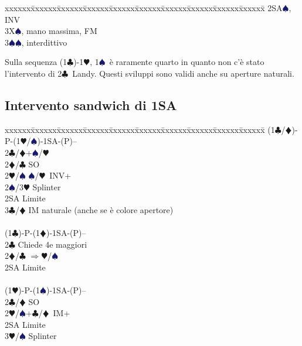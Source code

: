 \documentclass[a4paper,italian]{article}
\newcommand{\BC}{\textcolor{OliveGreen}{$\clubsuit$}}
\newcommand{\BD}{\textcolor{RedOrange}{$\vardiamondsuit$}}
\newcommand{\BH}{\textcolor{Red2}{$\varheartsuit${}}}
\newcommand{\BS}{\textcolor{MidnightBlue}{$\spadesuit${}}}
\newenvironment{bidtable}
{\begin{tabbing}

    xxxxxx\=xxxxxx\=xxxxxx\=xxxxxx\=xxxxxx\=xxxxxx\=xxxxxx\=xxxxxx\=xxxxxx\=xxxxxx\=\kill}
{\end{tabbing} }%
\newenvironment{sviluppi}
{\begin{tcolorbox}[colframe=azzurro,title=Sviluppi particolari]}
    {
\end{tcolorbox} }%
\begin{document}
\begin{multicols}{2}
\begin{sviluppi}
\begin{bidtable}
                                                2SA\BS, INV\\
                                                3X\BS, mano massima, FM\\
                                                3\BS{}\BS, interdittivo\\
                                            \end{bidtable}
                                            Sulla sequenza (1\BC)-1\BH, 1\BS\ è raramente quarto in quanto non c'è stato l'intervento di 2\BC\ Landy. 
                                            Questi sviluppi sono validi anche su aperture naturali.

                                        \end{sviluppi}
                                        \subsection{Intervento sandwich di 1SA}
                                        \begin{bidtable}
                                            (1\BC/\BD)-P-(1\BH/\BS)-1SA-(P)--\+\\
                                            2\BC/\BD{}+\BS/\BH\\
                                            2\BD/\BC\> SO\\
                                            2\BH/\BS{} \BS/\BH\ INV+\\
                                            2\BS/3\BH\> Splinter\\
                                            2SA\> Limite\\
                                            3\BC/\BD\> IM naturale (anche se è colore apertore)\-\\
                                        \\
                                        (1\BC)-P-(1\BD)-1SA-(P)--\+\\
                                        2\BC\> Chiede 4e maggiori\\
                                        2\BD/\BC\> $\Rightarrow$\BH/\BS\\
                                        2SA\> Limite\-\\
                                        \\
                                        (1\BH)-P-(1\BS)-1SA-(P)--\+\\
                                        2\BC/\BD\> SO\\
                                        2\BH/\BS{}+\BC/\BD\ IM+\\
                                        2SA\> Limite\\
                                        3\BH/\BS\> Splinter\\


\end{bidtable}
\end{multicols}
\end{document}
